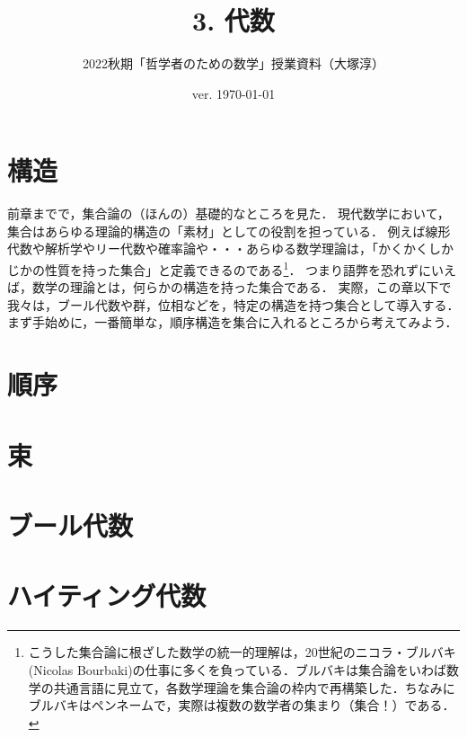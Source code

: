 \documentclass[11pt,a4paper]{jsarticle}
\begin{document}
\title{3. 代数}
\author{2022秋期「哲学者のための数学」授業資料（大塚淳）}
\date{ver. \today}
\maketitle

\section{構造}
前章までで，集合論の（ほんの）基礎的なところを見た．
現代数学において，集合はあらゆる理論的構造の「素材」としての役割を担っている．
例えば線形代数や解析学やリー代数や確率論や・・・あらゆる数学理論は，「かくかくしかじかの性質を持った集合」と定義できるのである\footnote{こうした集合論に根ざした数学の統一的理解は，20世紀のニコラ・ブルバキ(Nicolas Bourbaki)の仕事に多くを負っている．ブルバキは集合論をいわば数学の共通言語に見立て，各数学理論を集合論の枠内で再構築した．ちなみにブルバキはペンネームで，実際は複数の数学者の集まり（集合！）である．}．
つまり語弊を恐れずにいえば，数学の理論とは，何らかの構造を持った集合である．
実際，この章以下で我々は，ブール代数や群，位相などを，特定の構造を持つ集合として導入する．
まず手始めに，一番簡単な，順序構造を集合に入れるところから考えてみよう．


\section{順序}


\section{束}


\section{ブール代数}


\section{ハイティング代数}
\end{document}
